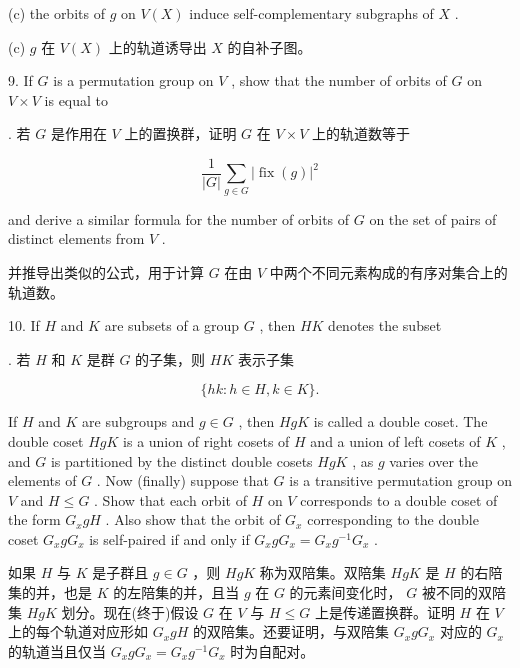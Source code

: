 \documentclass[10pt]{article}
\begin{document}
(c) the orbits of \(g\) on \(V\left( X\right)\) induce self-complementary subgraphs of \(X\) .

\begin{tcolorbox}\relax
(c) \(g\) 在 \(V\left( X\right)\) 上的轨道诱导出 \(X\) 的自补子图。
\end{tcolorbox}

9. If \(G\) is a permutation group on \(V\) , show that the number of orbits of \(G\) on \(V \times  V\) is equal to

\begin{tcolorbox}. 若 \(G\) 是作用在 \(V\) 上的置换群，证明 \(G\) 在 \(V \times  V\) 上的轨道数等于
\end{tcolorbox}

\[
\frac{1}{\left| G\right| }\mathop{\sum }\limits_{{g \in  G}}{\left| \operatorname{fix}\left( g\right) \right| }^{2}
\]

and derive a similar formula for the number of orbits of \(G\) on the set of pairs of distinct elements from \(V\) .

\begin{tcolorbox}\relax
并推导出类似的公式，用于计算 \(G\) 在由 \(V\) 中两个不同元素构成的有序对集合上的轨道数。
\end{tcolorbox}

10. If \(H\) and \(K\) are subsets of a group \(G\) , then \({HK}\) denotes the subset

\begin{tcolorbox}. 若 \(H\) 和 \(K\) 是群 \(G\) 的子集，则 \({HK}\) 表示子集
\end{tcolorbox}

\[
\{ {hk} : h \in  H,k \in  K\} .
\]

If \(H\) and \(K\) are subgroups and \(g \in  G\) , then \({HgK}\) is called a double coset. The double coset \({HgK}\) is a union of right cosets of \(H\) and a union of left cosets of \(K\) , and \(G\) is partitioned by the distinct double cosets \({HgK}\) , as \(g\) varies over the elements of \(G\) . Now (finally) suppose that \(G\) is a transitive permutation group on \(V\) and \(H \leq  G\) . Show that each orbit of \(H\) on \(V\) corresponds to a double coset of the form \({G}_{x}{gH}\) . Also show that the orbit of \({G}_{x}\) corresponding to the double coset \({G}_{x}g{G}_{x}\) is self-paired if and only if \({G}_{x}g{G}_{x} = {G}_{x}{g}^{-1}{G}_{x}\) .

\begin{tcolorbox}\relax
如果 \(H\) 与 \(K\) 是子群且 \(g \in  G\) ，则 \({HgK}\) 称为双陪集。双陪集 \({HgK}\) 是 \(H\) 的右陪集的并，也是 \(K\) 的左陪集的并，且当 \(g\) 在 \(G\) 的元素间变化时， \(G\) 被不同的双陪集 \({HgK}\) 划分。现在(终于)假设 \(G\) 在 \(V\) 与 \(H \leq  G\) 上是传递置换群。证明 \(H\) 在 \(V\) 上的每个轨道对应形如 \({G}_{x}{gH}\) 的双陪集。还要证明，与双陪集 \({G}_{x}g{G}_{x}\) 对应的 \({G}_{x}\) 的轨道当且仅当 \({G}_{x}g{G}_{x} = {G}_{x}{g}^{-1}{G}_{x}\) 时为自配对。
\end{tcolorbox}
\end{document}
